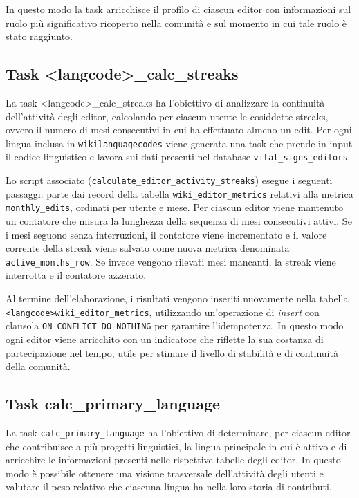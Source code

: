 In questo modo la task arricchisce il profilo di ciascun editor con informazioni sul ruolo più significativo ricoperto nella comunità e sul momento in cui tale ruolo è stato raggiunto.

\subsection{Task \textless langcode\textgreater\_calc\_streaks}
\label{subsec:calc_streaks}

La task \textless langcode\textgreater\_calc\_streaks ha l’obiettivo di analizzare la continuità dell’attività degli editor, calcolando per ciascun utente le cosiddette streaks, ovvero il numero di mesi consecutivi in cui ha effettuato almeno un edit. Per ogni lingua inclusa in \texttt{wikilanguagecodes} viene generata una task che prende in input il codice linguistico e lavora sui dati presenti nel database \texttt{vital\_signs\_editors}.

Lo script associato (\texttt{calculate\_editor\_activity\_streaks}) esegue i seguenti passaggi: parte dai record della tabella \texttt{wiki\_editor\_metrics} relativi alla metrica \texttt{monthly\_edits}, ordinati per utente e mese. Per ciascun editor viene mantenuto un contatore che misura la lunghezza della sequenza di mesi consecutivi attivi. Se i mesi seguono senza interruzioni, il contatore viene incrementato e il valore corrente della streak viene salvato come nuova metrica denominata \texttt{active\_months\_row}. Se invece vengono rilevati mesi mancanti, la streak viene interrotta e il contatore azzerato.

Al termine dell’elaborazione, i risultati vengono inseriti nuovamente nella tabella \texttt{<langcode>wiki\_editor\_metrics}, utilizzando un’operazione di \emph{insert} con clausola \texttt{ON CONFLICT DO NOTHING} per garantire l’idempotenza. In questo modo ogni editor viene arricchito con un indicatore che riflette la sua costanza di partecipazione nel tempo, utile per stimare il livello di stabilità e di continuità della comunità.

\subsection{Task calc\_primary\_language}
\label{subsec:calc_primary_language}

La task \texttt{calc\_primary\_language} ha l’obiettivo di determinare, per ciascun editor che contribuisce a più progetti linguistici, la lingua principale in cui è attivo e di arricchire le informazioni presenti nelle rispettive tabelle degli editor. In questo modo è possibile ottenere una visione trasversale dell’attività degli utenti e valutare il peso relativo che ciascuna lingua ha nella loro storia di contributi.

